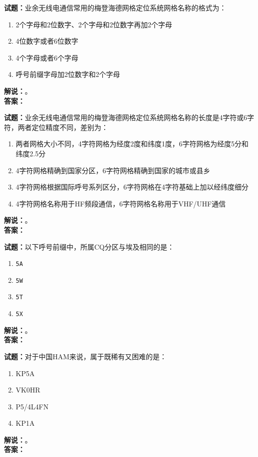 \documentclass{ctexbook}
\begin{document}
\bigskip

\noindent\textbf{试题：}业余无线电通信常用的梅登海德网格定位系统网格名称的格式为：
\begin{enumerate}[leftmargin=3em]
  \item 2个字母和2位数字、2个字母和2位数字再加2个字母
  \item 4位数字或者6位数字
  \item 4个字母或者6个字母
  \item 呼号前缀字母加2位数字和2个字母
\end{enumerate}
\noindent\textbf{解说：}\textbf{}。\\\noindent\textbf{答案：}

\bigskip

\noindent\textbf{试题：}业余无线电通信常用的梅登海德网格定位系统网格名称的长度是4字符或6字符，两者定位精度不同，差别为：
\begin{enumerate}[leftmargin=3em]
  \item 两者网格大小不同，4字符网格为经度2度和纬度1度，6字符网格为经度5分和纬度2.5分
  \item 4字符网格精确到国家分区，6字符网格精确到国家的城市或县乡
  \item 4字符网格根据国际呼号系列区分，6字符网格在4字符基础上加以经纬度细分
  \item 4字符网格名称用于HF频段通信，6字符网格名称用于VHF/UHF通信
\end{enumerate}
\noindent\textbf{解说：}\textbf{}。\\\noindent\textbf{答案：}

\bigskip

\noindent\textbf{试题：}以下呼号前缀中，所属CQ分区与埃及相同的是：
\begin{enumerate}[leftmargin=3em]
  \item \texttt{5A}
  \item \texttt{5W}
  \item \texttt{5T}
  \item \texttt{5X}
\end{enumerate}
\noindent\textbf{解说：}\textbf{}。\\\noindent\textbf{答案：}

\bigskip

\noindent\textbf{试题：}对于中国HAM来说，属于既稀有又困难的是：
\begin{enumerate}[leftmargin=3em]
  \item KP5A
  \item VK0HR
  \item P5/4L4FN
  \item KP1A
\end{enumerate}
\noindent\textbf{解说：}\textbf{}。\\\noindent\textbf{答案：}
\end{document}
